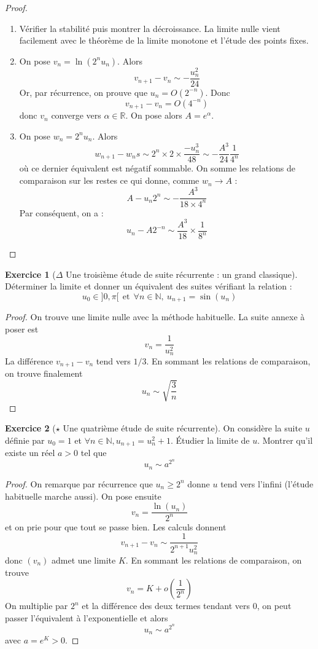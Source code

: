 \documentclass[french]{book}
\newcommand{\N}{\mathbb{N}}
\newcommand{\R}{\mathbb{R}}
\theoremstyle{definition}
\newtheorem{ex}{Exercice}[chapter]
\theoremstyle{theorem}
\theoremstyle{remark}
\begin{document}
\begin{proof}
	\begin{enumerate}
		\item Vérifier la stabilité puis montrer la décroissance. La limite nulle vient facilement avec le théorème de la limite monotone et l'étude des points fixes.
		\item On pose $v_n=\ln(2^nu_n)$. Alors $$v_{n+1}-v_n\sim-\frac{u_n^2}{24}$$ Or, par récurrence, on prouve que $u_n=O(2^{-n})$. Donc $$v_{n+1}-v_n=O(4^{-n})$$ donc $v_n$ converge vers $\alpha\in\R$. On pose alors $A=e^{\alpha}$.
		\item On pose $w_n=2^nu_n$. Alors $$w_{n+1}-w_ns\sim 2^n\times 2\times\frac{-u_n^3}{48}\sim-\frac{A^3}{24}\frac{1}{4^n}$$ où ce dernier équivalent est négatif sommable. On somme les relations de comparaison sur les restes ce qui donne, comme $w_n\to A$ : $$A-u_n2^n\sim-\frac{A^3}{18\times 4^n}$$ Par conséquent, on a : $$u_n-A2^{-n}\sim\frac{A^3}{18}\times\frac{1}{8^n}$$
	\end{enumerate}
\end{proof}

\begin{ex}[$\Delta$ Une troisième étude de suite récurrente : un grand classique]
	Déterminer la limite et donner un équivalent des suites vérifiant la relation : $$u_{0}\in]0,\pi[ \ \ \text{et} \ \ \forall n\in\N,\ u_{n+1}=\sin(u_n)$$
\end{ex}

\begin{proof}
	On trouve une limite nulle avec la méthode habituelle. La suite annexe à poser est $$v_n=\frac{1}{u_n^2}$$ La différence $v_{n+1}-v_n$ tend vers $1/3$. En sommant les relations de comparaison, on trouve finalement $$u_n\sim\sqrt{\frac{3}{n}}$$
\end{proof}

\begin{ex}[$\star$ Une quatrième étude de suite récurrente]
	On considère la suite $u$ définie par $u_0=1$ et $\forall n\in\N, u_{n+1}=u_n^2+1$. Étudier la limite de $u$. Montrer qu'il existe un réel $a>0$ tel que $$u_n\sim a^{2^n}$$
\end{ex}

\begin{proof}
	On remarque par récurrence que $u_n\geqslant 2^n$ donne $u$ tend vers l'infini (l'étude habituelle marche aussi). On pose ensuite $$v_n=\frac{\ln(u_n)}{2^n}$$ et on prie pour que tout se passe bien. Les calculs donnent $$v_{n+1}-v_n\sim\frac{1}{2^{n+1}u_n^2}$$ donc $(v_n)$ admet une limite $K$. En sommant les relations de comparaison, on trouve $$v_n=K+o\left(\frac{1}{2^n}\right)$$ On multiplie par $2^n$ et la différence des deux termes tendant vers $0$, on peut passer l'équivalent à l'exponentielle et alors $$u_n\sim a^{2^n}$$ avec $a=e^K>0$.
\end{proof}
\end{document}
